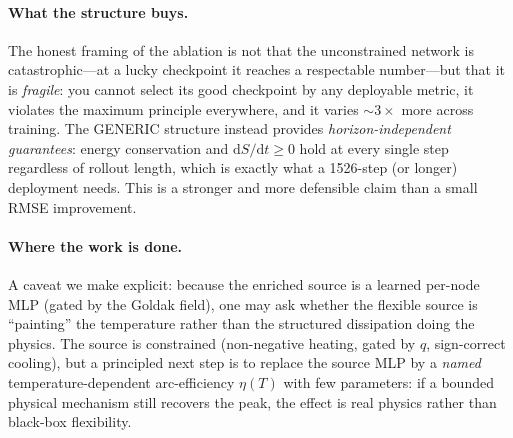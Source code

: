 \documentclass[11pt]{article}
\newcommand{\dd}{\mathrm{d}}
\theoremstyle{definition}
\begin{document}
\paragraph{What the structure buys.} The honest framing of the ablation is not that the
unconstrained network is catastrophic---at a lucky checkpoint it reaches a respectable
number---but that it is \emph{fragile}: you cannot select its good checkpoint by any
deployable metric, it violates the maximum principle everywhere, and it varies
$\sim$$3\times$ more across training. The GENERIC structure instead provides
\emph{horizon-independent guarantees}: energy conservation and $\dd S/\dd t\ge0$ hold at
every single step regardless of rollout length, which is exactly what a \num{1526}-step
(or longer) deployment needs. This is a stronger and more defensible claim than a small
RMSE improvement.

\paragraph{Where the work is done.} A caveat we make explicit: because the enriched
source is a learned per-node MLP (gated by the Goldak field), one may ask whether the
flexible source is ``painting'' the temperature rather than the structured dissipation
doing the physics. The source is constrained (non-negative heating, gated by $q$,
sign-correct cooling), but a principled next step is to replace the source MLP by a
\emph{named} temperature-dependent arc-efficiency $\eta(T)$ with few parameters: if a
bounded physical mechanism still recovers the peak, the effect is real physics rather
than black-box flexibility.
\end{document}
